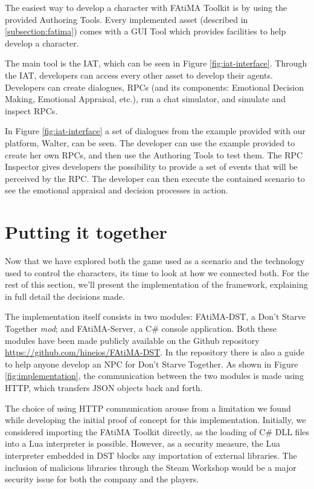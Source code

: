\noindent The easiest way to develop a character with \ac{FAtiMA} Toolkit is by using the provided Authoring Tools.
Every implemented asset (described in \ref{subsection:fatima}) comes with a \ac{GUI} Tool which provides facilities to help develop a character.

The main tool is the \ac{IAT}, which can be seen in Figure \ref{fig:iat-interface}.
Through the \ac{IAT}, developers can access every other asset to develop their agents.
Developers can create dialogues, \acp{RPC} (and its components: Emotional Decision Making, Emotional Appraisal, etc.), run a chat simulator, and simulate and inspect \acp{RPC}.

In Figure \ref{fig:iat-interface} a set of dialogues from the example provided with our platform, Walter, can be seen.
The developer can use the example provided to create her own \acp{RPC}, and then use the Authoring Tools to test them.
The \ac{RPC} Inspector gives developers the possibility to provide a set of events that will be perceived by the \ac{RPC}.
The developer can then execute the contained scenario to see the emotional appraisal and decision processes in action.

\section{Putting it together}

\noindent Now that we have explored both the game used as a scenario and the technology used to control the characters, its time to look at how we connected both.
For the rest of this section, we'll present the implementation of the framework, explaining in full detail the decisions made.

The implementation itself consists in two modules: FAtiMA-DST, a Don't Starve Together \textit{mod}; and FAtiMA-Server, a C\# console application.
Both these modules have been made publicly available on the Github repository \href{https://github.com/hineios/FAtiMA-DST}{https://github.com/hineios/FAtiMA-DST}.
In the repository there is also a guide to help anyone develop an \ac{NPC} for Don't Starve Together.
As shown in Figure \ref{fig:implementation}, the communication between the two modules is made using \ac{HTTP}, which transfers \ac{JSON} objects back and forth.

The choice of using \ac{HTTP} communication arouse from a limitation we found while developing the initial proof of concept for this implementation.
Initially, we considered importing the \ac{FAtiMA} Toolkit directly, as the loading of C\# \ac{DLL} files into a Lua interpreter is possible.
However, as a security measure, the Lua interpreter embedded in \ac{DST} blocks any importation of external libraries.
The inclusion of malicious libraries through the Steam Workshop would be a major security issue for both the company and the players.

